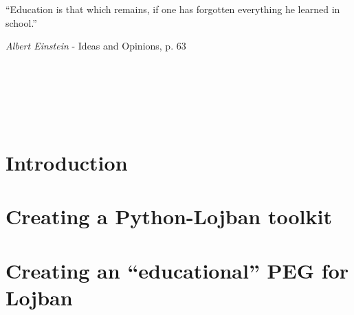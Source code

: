 

\usepackage[
    backend=bibtex, style=authortitle, defernumbers=true, backref=true, block=none, hyperref=true
]{biblatex}

\setlength{}




\pagestyle{empty}
\newpage \ \newpage


\newpage \ \newpage

\renewcommand{\epigraphsize}{\large}
\renewcommand{\epigraphwidth}{10cm}
\vspace{3cm}
\epigraph{``Education is that which remains, if one has forgotten everything he learned in school.''}{\textit{Albert Einstein} - Ideas and Opinions, p. 63}
\newpage \ \newpage

%

\vspace{-1cm}
\setcounter{tocdepth}{3}
\tableofcontents
\newpage \ \newpage
\listoffigures
\newpage \ \newpage %

\makeatletter
\@openrightfalse
\makeatother
\pagestyle{fancy}
\part{Introduction}


\part{Creating a Python-Lojban toolkit}



\part{Creating an ``educational'' PEG for Lojban}


